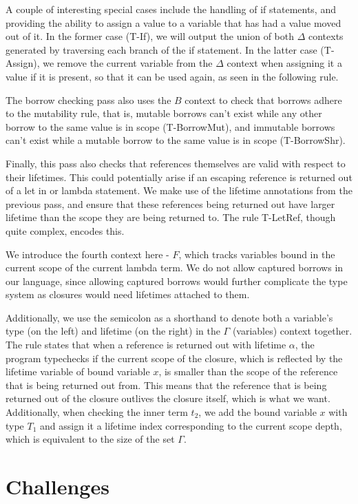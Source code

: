 \documentclass[letterpaper,11pt]{article}
\begin{document}
A couple of interesting special cases include the handling of if statements,
and providing the ability to assign a value to a variable that has had a value
moved out of it. In the former case (T-If), we will output the union of both $\Delta$
contexts generated by traversing each branch of the if statement. In the latter case (T-Assign),
we remove the current variable from the $\Delta$ context when assigning it a value
if it is present, so that it can be used again, as seen in the following rule.

The borrow checking pass also uses the $B$ context to check that borrows adhere to
the mutability rule, that is, mutable borrows can't exist while any other borrow
to the same value is in scope (T-BorrowMut), and immutable borrows can't exist while a mutable
borrow to the same value is in scope (T-BorrowShr).

Finally, this pass also checks that references themselves are valid with respect
to their lifetimes. This could potentially arise if an escaping reference is returned
out of a let in or lambda statement. We make use of the lifetime annotations from
the previous pass, and ensure that these references being returned out have
larger lifetime than the scope they are being returned to. The rule T-LetRef,
though quite complex, encodes this.

We introduce the fourth context here - $F$, which tracks variables bound in the current
scope of the current lambda term. We do not allow captured borrows in our language, since allowing captured borrows 
would further complicate the type system as closures would need lifetimes attached to them.

Additionally, we use the semicolon as a shorthand to denote both a variable's type (on the left) and lifetime (on the right) in
the $\Gamma$ (variables) context together. The rule states that
when a reference is returned out with lifetime $\alpha$, the program typechecks
if the current scope of the closure, which is reflected by the lifetime variable
of bound variable $x$, is smaller than the scope of the reference that is being
returned out from. This means that the reference that is being returned out of
the closure outlives the closure itself, which is what we want. Additionally, when checking
the inner term $t_2$, we add the bound variable $x$ with type $T_1$ and assign it a lifetime index
corresponding to the current scope depth, which is equivalent to the size of the set $\Gamma$.

\section{Challenges}
\end{document}

